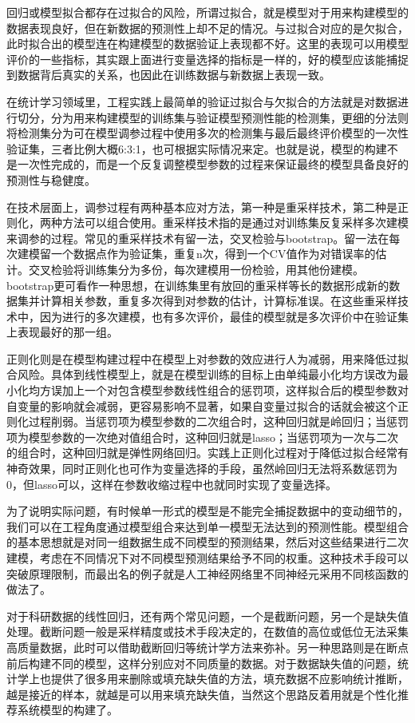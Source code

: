 \documentclass[]{tufte-book}
\begin{document}
回归或模型拟合都存在过拟合的风险，所谓过拟合，就是模型对于用来构建模型的数据表现良好，但在新数据的预测性上却不足的情况。与过拟合对应的是欠拟合，此时拟合出的模型连在构建模型的数据验证上表现都不好。这里的表现可以用模型评价的一些指标，其实跟上面进行变量选择的指标是一样的，好的模型应该能捕捉到数据背后真实的关系，也因此在训练数据与新数据上表现一致。

在统计学习领域里，工程实践上最简单的验证过拟合与欠拟合的方法就是对数据进行切分，分为用来构建模型的训练集与验证模型预测性能的检测集，更细的分法则将检测集分为可在模型调参过程中使用多次的检测集与最后最终评价模型的一次性验证集，三者比例大概6:3:1，也可根据实际情况来定。也就是说，模型的构建不是一次性完成的，而是一个反复调整模型参数的过程来保证最终的模型具备良好的预测性与稳健度。

在技术层面上，调参过程有两种基本应对方法，第一种是重采样技术，第二种是正则化，两种方法可以组合使用。重采样技术指的是通过对训练集反复采样多次建模来调参的过程。常见的重采样技术有留一法，交叉检验与bootstrap。留一法在每次建模留一个数据点作为验证集，重复n次，得到一个CV值作为对错误率的估计。交叉检验将训练集分为多份，每次建模用一份检验，用其他份建模。bootstrap更可看作一种思想，在训练集里有放回的重采样等长的数据形成新的数据集并计算相关参数，重复多次得到对参数的估计，计算标准误。在这些重采样技术中，因为进行的多次建模，也有多次评价，最佳的模型就是多次评价中在验证集上表现最好的那一组。

正则化则是在模型构建过程中在模型上对参数的效应进行人为减弱，用来降低过拟合风险。具体到线性模型上，就是在模型训练的目标上由单纯最小化均方误改为最小化均方误加上一个对包含模型参数线性组合的惩罚项，这样拟合后的模型参数对自变量的影响就会减弱，更容易影响不显著，如果自变量过拟合的话就会被这个正则化过程削弱。当惩罚项为模型参数的二次组合时，这种回归就是岭回归；当惩罚项为模型参数的一次绝对值组合时，这种回归就是lasso；当惩罚项为一次与二次的组合时，这种回归就是弹性网络回归。实践上正则化过程对于降低过拟合经常有神奇效果，同时正则化也可作为变量选择的手段，虽然岭回归无法将系数惩罚为0，但lasso可以，这样在参数收缩过程中也就同时实现了变量选择。

为了说明实际问题，有时候单一形式的模型是不能完全捕捉数据中的变动细节的，我们可以在工程角度通过模型组合来达到单一模型无法达到的预测性能。模型组合的基本思想就是对同一组数据生成不同模型的预测结果，然后对这些结果进行二次建模，考虑在不同情况下对不同模型预测结果给予不同的权重。这种技术手段可以突破原理限制，而最出名的例子就是人工神经网络里不同神经元采用不同核函数的做法了。

对于科研数据的线性回归，还有两个常见问题，一个是截断问题，另一个是缺失值处理。截断问题一般是采样精度或技术手段决定的，在数值的高位或低位无法采集高质量数据，此时可以借助截断回归等统计学方法来弥补。另一种思路则是在断点前后构建不同的模型，这样分别应对不同质量的数据。对于数据缺失值的问题，统计学上也提供了很多用来删除或填充缺失值的方法，填充数据不应影响统计推断，越是接近的样本，就越是可以用来填充缺失值，当然这个思路反着用就是个性化推荐系统模型的构建了。
\end{document}
